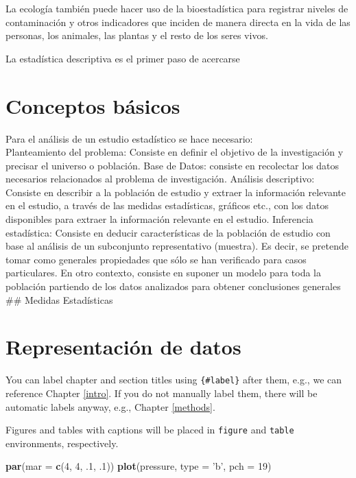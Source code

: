 \documentclass[
]{book}
\newenvironment{Shaded}{\begin{snugshade}}{\end{snugshade}}
\newcommand{\DataTypeTok}[1]{\textcolor[rgb]{0.13,0.29,0.53}{#1}}
\newcommand{\DecValTok}[1]{\textcolor[rgb]{0.00,0.00,0.81}{#1}}
\newcommand{\FloatTok}[1]{\textcolor[rgb]{0.00,0.00,0.81}{#1}}
\newcommand{\KeywordTok}[1]{\textcolor[rgb]{0.13,0.29,0.53}{\textbf{#1}}}
\newcommand{\NormalTok}[1]{#1}
\newcommand{\StringTok}[1]{\textcolor[rgb]{0.31,0.60,0.02}{#1}}
\begin{document}
La ecología también puede hacer uso de la bioestadística para registrar niveles de contaminación y otros indicadores que inciden de manera directa en la vida de las personas, los animales, las plantas y el resto de los seres vivos.

La estadística descriptiva es el primer paso de acercarse

\hypertarget{conceptos-buxe1sicos}{%
\section{Conceptos básicos}\label{conceptos-buxe1sicos}}

Para el análisis de un estudio estadístico se hace necesario:\\
Planteamiento del problema: Consiste en definir el objetivo de la investigación y precisar el
universo o población.
Base de Datos: consiste en recolectar los datos necesarios relacionados al problema de
investigación.
Análisis descriptivo: Consiste en describir a la población de estudio y extraer la información
relevante en el estudio, a través de las medidas estadísticas, gráficos etc., con los datos disponibles
para extraer la información relevante en el estudio.
Inferencia estadística: Consiste en deducir características de la población de estudio con base al
análisis de un subconjunto representativo (muestra). Es decir, se pretende tomar como generales
propiedades que sólo se han verificado para casos particulares. En otro contexto, consiste en
suponer un modelo para toda la población partiendo de los datos analizados para obtener
conclusiones generales
\#\# Medidas Estadísticas

\hypertarget{representaciuxf3n-de-datos}{%
\section{Representación de datos}\label{representaciuxf3n-de-datos}}

You can label chapter and section titles using \texttt{\{\#label\}} after them, e.g., we can reference Chapter \ref{intro}. If you do not manually label them, there will be automatic labels anyway, e.g., Chapter \ref{methods}.

Figures and tables with captions will be placed in \texttt{figure} and \texttt{table} environments, respectively.

\begin{Shaded}
\begin{Highlighting}[]
\KeywordTok{par}\NormalTok{(}\DataTypeTok{mar =} \KeywordTok{c}\NormalTok{(}\DecValTok{4}\NormalTok{, }\DecValTok{4}\NormalTok{, }\FloatTok{.1}\NormalTok{, }\FloatTok{.1}\NormalTok{))}
\KeywordTok{plot}\NormalTok{(pressure, }\DataTypeTok{type =} \StringTok{'b'}\NormalTok{, }\DataTypeTok{pch =} \DecValTok{19}\NormalTok{)}
\end{Highlighting}
\end{Shaded}
\end{document}
